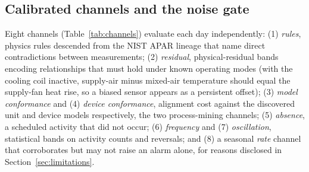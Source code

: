 \documentclass[11pt,letterpaper]{article}
\begin{document}
\subsection{Calibrated channels and the noise gate}

Eight channels (Table~\ref{tab:channels}) evaluate each day independently: (1) \emph{rules}, physics rules descended from the NIST APAR lineage \cite{schein2006apar} that name direct contradictions between measurements; (2) \emph{residual}, physical-residual bands encoding relationships that must hold under known operating modes (with the cooling coil inactive, supply-air minus mixed-air temperature should equal the supply-fan heat rise, so a biased sensor appears as a persistent offset); (3) \emph{model conformance} and (4) \emph{device conformance}, alignment cost \cite{vanderaalst2012replaying,carmona2018conformancechecking} against the discovered unit and device models respectively, the two process-mining channels; (5) \emph{absence}, a scheduled activity that did not occur; (6) \emph{frequency} and (7) \emph{oscillation}, statistical bands on activity counts and reversals; and (8) a seasonal \emph{rate} channel that corroborates but may not raise an alarm alone, for reasons disclosed in Section~\ref{sec:limitations}.
\end{document}
